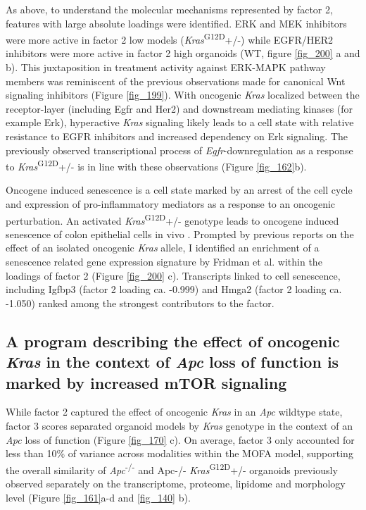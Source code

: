 \begin{flushleft}
As above, to understand the molecular mechanisms represented by factor 2, features with large absolute loadings were identified. ERK and MEK inhibitors were more active in factor 2 low models (\textit{Kras}\textsuperscript{G12D}+/-) while EGFR/HER2 inhibitors were more active in factor 2 high organoids (WT, figure \ref{fig_200} a and b). This juxtaposition in treatment activity against ERK-MAPK pathway members was reminiscent of the previous observations made for canonical Wnt signaling inhibitors (Figure \ref{fig_199}). With oncogenic \textit{Kras} localized between the receptor-layer (including Egfr and Her2) and downstream mediating kinases (for example Erk), hyperactive \textit{Kras} signaling likely leads to a cell state with relative resistance to EGFR inhibitors and increased dependency on Erk signaling. The previously observed transcriptional process of \textit{Egfr}-downregulation as a response to \textit{Kras}\textsuperscript{G12D}+/- is in line with these observations (Figure \ref{fig_162}b). 

\bigbreak

Oncogene induced senescence is a cell state marked by an arrest of the cell cycle and expression of pro-inflammatory mediators as a response to an oncogenic perturbation. An activated \textit{Kras}\textsuperscript{G12D}+/- genotype leads to oncogene induced senescence of colon epithelial cells in vivo . Prompted by previous reports on the effect of an isolated oncogenic \textit{Kras} allele, I identified an enrichment of a senescence related gene expression signature by Fridman et al. within the loadings of factor 2 \citep{fridmanCriticalPathwaysCellular2008} (Figure \ref{fig_200} c). Transcripts linked to cell senescence, including Igfbp3 (factor 2 loading ca. -0.999) and Hmga2 (factor 2 loading ca. -1.050) ranked among the strongest contributors to the factor. 
\bigbreak


\newpage
\subsection{A program describing the effect of oncogenic \textit{Kras} in the context of \textit{Apc} loss of function is marked by increased mTOR signaling }

While factor 2 captured the effect of oncogenic \textit{Kras} in an \textit{Apc} wildtype state, factor 3 scores separated organoid models by \textit{Kras} genotype in the context of an \textit{Apc} loss of function (Figure \ref{fig_170} c). On average, factor 3 only accounted for less than 10\% of variance across modalities within the MOFA model, supporting the overall similarity of \textit{Apc}\textsuperscript{-/-}  and Apc-/- \textit{Kras}\textsuperscript{G12D}+/- organoids previously observed separately on the transcriptome, proteome, lipidome and morphology level (Figure \ref{fig_161}a-d and \ref{fig_140} b).


\end{flushleft}
